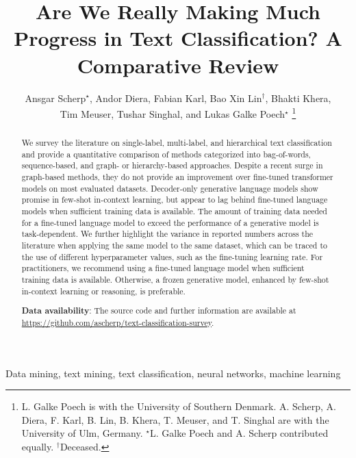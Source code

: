 \documentclass[lettersize,journal]{IEEEtran}
\begin{document}
\title{Are We Really Making Much Progress in Text Classification? A Comparative Review}

\author{Ansgar Scherp$^\star$, 
Andor Diera, Fabian Karl, Bao Xin Lin$^\dagger$, Bhakti Khera,

Tim Meuser, Tushar Singhal, and Lukas Galke Poech$^\star$ 
\thanks{L. Galke Poech is with the University of Southern Denmark. A. Scherp, A. Diera, F. Karl, B. Lin, B. Khera, T. Meuser, and T. Singhal are with the University of Ulm, Germany.
$^\star$L. Galke Poech and A. Scherp contributed equally. $^\dagger$Deceased.}

}

\maketitle

\begin{abstract}
We survey the literature on single-label, multi-label, and hierarchical text classification and provide a quantitative comparison of methods categorized into bag-of-words, sequence-based, and graph- or hierarchy-based approaches.
Despite a recent surge in graph-based methods, they do not provide an improvement over fine-tuned transformer models on most evaluated datasets. 
Decoder-only generative language models show promise in few-shot in-context learning, but appear to lag behind fine-tuned language models when sufficient training data is available. 
The amount of training data needed for a fine-tuned language model to exceed the performance of a generative model is task-dependent.
We further highlight the variance in reported numbers across the literature when applying the same model to the same dataset, which can be traced to the use of different hyperparameter values, such as the fine-tuning learning rate.
For practitioners, we recommend using a fine-tuned language model when sufficient training data is available.
Otherwise, a frozen generative model, enhanced by few-shot in-context learning or reasoning, is preferable.

\noindent \textbf{Data availability}: 
The source code and further information are available at \url{https://github.com/ascherp/text-classification-survey}.

\end{abstract}

\begin{IEEEkeywords}
Data mining, text mining, text classification, neural networks, machine learning
\end{IEEEkeywords}
\end{document}
